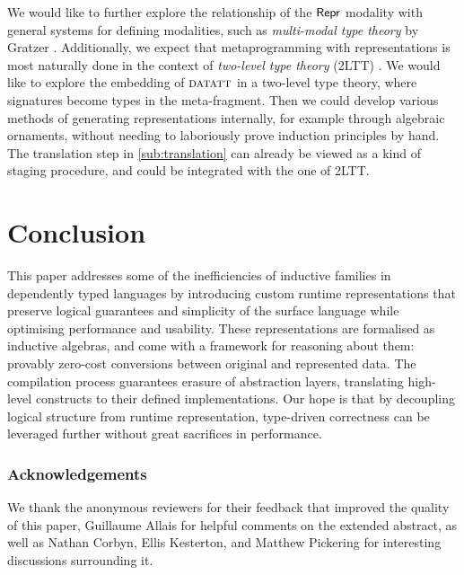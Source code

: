 We would like to further explore the relationship of the $\textsf{Repr}$ modality with
general systems for defining modalities, such as \emph{multi-modal type theory}
by Gratzer \cite{Gratzer2020-kf}. Additionally, we expect that metaprogramming with
representations is most naturally done in the context of \emph{two-level type theory} (2LTT)
\cite{Kovacs2022-vb}. We would like to explore the embedding of ${\textsc{datatt}}$
in a two-level type theory, where signatures become types in the meta-fragment.
Then we could develop various methods of generating representations internally,
for example through algebraic ornaments, without needing to laboriously prove
induction principles by hand. The translation step in \cref{sub:translation}
can already be viewed as a kind of staging procedure, and could be
integrated with the one of 2LTT.

\section{Conclusion}

This paper addresses some of the inefficiencies of inductive families in
dependently typed languages by introducing custom runtime representations that
preserve logical guarantees and simplicity of the surface language while
optimising performance and usability. These representations are formalised as inductive
algebras, and come with a framework for reasoning about them: provably zero-cost
conversions between original and represented data.
The compilation process guarantees erasure of abstraction layers, translating
high-level constructs to their defined implementations. Our hope is that by
decoupling logical structure from runtime representation, type-driven
correctness can be leveraged further without great sacrifices in performance.


\subsubsection{Acknowledgements}
We thank the anonymous reviewers for their feedback that
improved the quality of this paper, Guillaume Allais for helpful
comments on the extended abstract, as well as Nathan Corbyn, Ellis
Kesterton, and Matthew Pickering for interesting discussions surrounding it.
